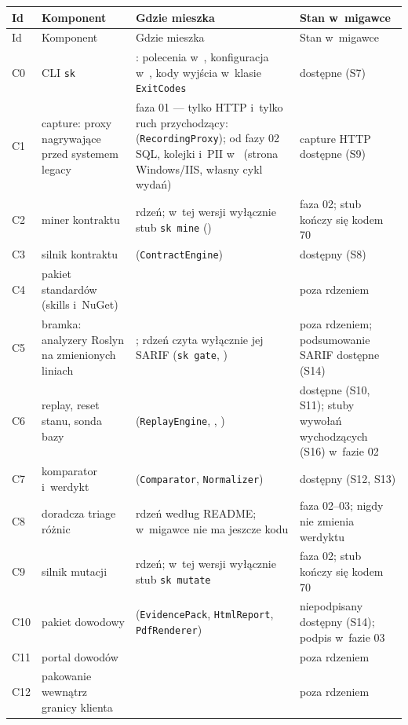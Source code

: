 {\small
\begin{xltabular}{\linewidth}{@{}l >{\raggedright\arraybackslash}p{2.9cm} >{\raggedright\arraybackslash}X >{\raggedright\arraybackslash}p{3.3cm}@{}}
\toprule
Id & Komponent & Gdzie mieszka & Stan w~migawce \\
\midrule
\endfirsthead
\toprule
Id & Komponent & Gdzie mieszka & Stan w~migawce \\
\midrule
\endhead
\bottomrule
\endlastfoot
C0 & CLI \texttt{sk} & : polecenia w~, konfiguracja
w~, kody wyjścia w~klasie \texttt{ExitCodes} & dostępne (S7) \\
C1 & capture: proxy nagrywające przed systemem legacy & faza 01 --- tylko HTTP i~tylko ruch
przychodzący:  (\texttt{RecordingProxy}); od fazy 02 SQL,
kolejki i~PII w~ (strona Windows/IIS, własny cykl
wydań) & capture HTTP dostępne (S9) \\
C2 & miner kontraktu & rdzeń; w~tej wersji wyłącznie stub \texttt{sk mine}
() & faza 02; stub kończy się kodem 70 \\
C3 & silnik kontraktu &  (\texttt{ContractEngine}) & dostępny
(S8) \\
C4 & pakiet standardów (skills i~NuGet) &  & poza
rdzeniem \\
C5 & bramka: analyzery Roslyn na zmienionych liniach & ; rdzeń
czyta wyłącznie jej SARIF (\texttt{sk gate}, ) & poza
rdzeniem; podsumowanie SARIF dostępne (S14) \\
C6 & replay, reset stanu, sonda bazy &  (\texttt{ReplayEngine},
, ) & dostępne (S10, S11); stuby wywołań wychodzących (S16) w~fazie 02 \\
C7 & komparator i~werdykt &  (\texttt{Comparator},
\texttt{Normalizer}) & dostępny (S12, S13) \\
C8 & doradcza triage różnic & rdzeń według README; w~migawce nie ma jeszcze kodu & faza
02–03; nigdy nie zmienia werdyktu \\
C9 & silnik mutacji & rdzeń; w~tej wersji wyłącznie stub \texttt{sk mutate} & faza 02; stub
kończy się kodem 70 \\
C10 & pakiet dowodowy &  (\texttt{EvidencePack},
\texttt{HtmlReport}, \texttt{PdfRenderer}) & niepodpisany dostępny (S14); podpis w~fazie 03 \\
C11 & portal dowodów &  & poza rdzeniem \\
C12 & pakowanie wewnątrz granicy klienta &  & poza
rdzeniem \\
\end{xltabular}
}

